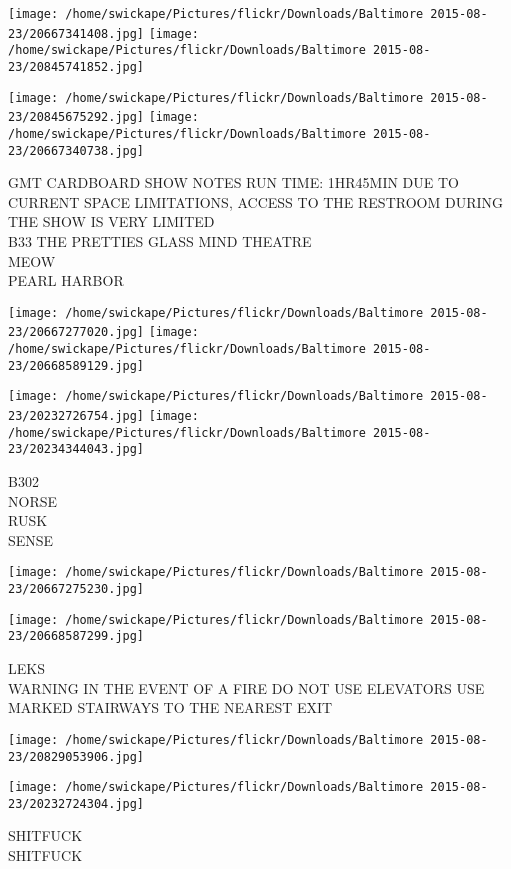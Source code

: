 \documentclass[10pt,letterpaper]{article}
\begin{document}
\texttt{[image: /home/swickape/Pictures/flickr/Downloads/Baltimore 2015-08-23/20667341408.jpg]}
\texttt{[image: /home/swickape/Pictures/flickr/Downloads/Baltimore 2015-08-23/20845741852.jpg]}

\texttt{[image: /home/swickape/Pictures/flickr/Downloads/Baltimore 2015-08-23/20845675292.jpg]}
\texttt{[image: /home/swickape/Pictures/flickr/Downloads/Baltimore 2015-08-23/20667340738.jpg]}

GMT CARDBOARD SHOW NOTES RUN TIME: 1HR45MIN DUE TO CURRENT SPACE LIMITATIONS, ACCESS TO THE RESTROOM DURING THE SHOW IS VERY LIMITED\\
B33 THE PRETTIES GLASS MIND THEATRE\\
MEOW\\
PEARL HARBOR
\pagebreak

\texttt{[image: /home/swickape/Pictures/flickr/Downloads/Baltimore 2015-08-23/20667277020.jpg]}
\texttt{[image: /home/swickape/Pictures/flickr/Downloads/Baltimore 2015-08-23/20668589129.jpg]}

\texttt{[image: /home/swickape/Pictures/flickr/Downloads/Baltimore 2015-08-23/20232726754.jpg]}
\texttt{[image: /home/swickape/Pictures/flickr/Downloads/Baltimore 2015-08-23/20234344043.jpg]}

B302\\
NORSE\\
RUSK\\
SENSE
\pagebreak

\texttt{[image: /home/swickape/Pictures/flickr/Downloads/Baltimore 2015-08-23/20667275230.jpg]}

\vspace{0.25in}
\texttt{[image: /home/swickape/Pictures/flickr/Downloads/Baltimore 2015-08-23/20668587299.jpg]}

LEKS\\
WARNING IN THE EVENT OF A FIRE DO NOT USE ELEVATORS USE MARKED STAIRWAYS TO THE NEAREST EXIT
\pagebreak

\texttt{[image: /home/swickape/Pictures/flickr/Downloads/Baltimore 2015-08-23/20829053906.jpg]}

\vspace{0.25in}
\texttt{[image: /home/swickape/Pictures/flickr/Downloads/Baltimore 2015-08-23/20232724304.jpg]}

SHITFUCK\\
SHITFUCK
\pagebreak
\end{document}
